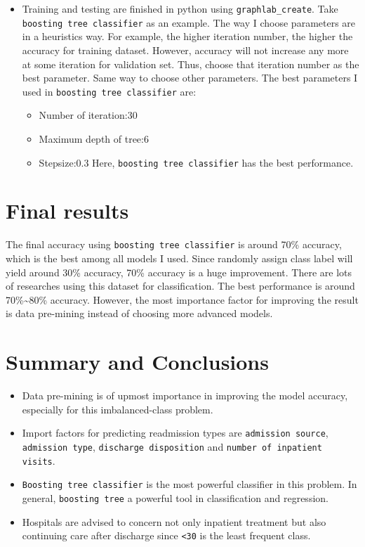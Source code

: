 \documentclass[]{article}
\begin{document}
\begin{itemize}
\itemsep1pt\parskip0pt
\item
  Training and testing are finished in python using
  \texttt{graphlab\_create}. Take \texttt{boosting tree classifier} as
  an example. The way I choose parameters are in a heuristics way. For
  example, the higher iteration number, the higher the accuracy for
  training dataset. However, accuracy will not increase any more at some
  iteration for validation set. Thus, choose that iteration number as
  the best parameter. Same way to choose other parameters. The best
  parameters I used in \texttt{boosting tree classifier} are:

  \begin{itemize}
  \itemsep1pt\parskip0pt
  \item
    Number of iteration:30
  \item
    Maximum depth of tree:6
  \item
    Stepsize:0.3 Here, \texttt{boosting tree classifier} has the best
    performance.
  \end{itemize}
\end{itemize}

\section{Final results}\label{final-results}

The final accuracy using \texttt{boosting tree classifier} is around
70\% accuracy, which is the best among all models I used. Since randomly
assign class label will yield around 30\% accuracy, 70\% accuracy is a
huge improvement. There are lots of researches using this dataset for
classification. The best performance is around 70\%\textasciitilde{}80\%
accuracy. However, the most importance factor for improving the result
is data pre-mining instead of choosing more advanced models.

\section{Summary and Conclusions}\label{summary-and-conclusions}

\begin{itemize}
\itemsep1pt\parskip0pt
\item
  Data pre-mining is of upmost importance in improving the model
  accuracy, especially for this imbalanced-class problem.
\item
  Import factors for predicting readmission types are
  \texttt{admission source}, \texttt{admission type},
  \texttt{discharge disposition} and
  \texttt{number of inpatient visits}.
\item
  \texttt{Boosting tree classifier} is the most powerful classifier in
  this problem. In general, \texttt{boosting tree} a powerful tool in
  classification and regression.
\item
  Hospitals are advised to concern not only inpatient treatment but also
  continuing care after discharge since \texttt{\textless{}30} is the
  least frequent class.
\end{itemize}
\end{document}
